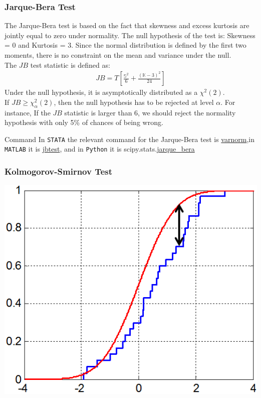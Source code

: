 \documentclass[xcolor=dvipsnames, english, 8pt]{beamer}
\begin{document}
\begin{frame}
    \frametitle{Jarque-Bera Test}
    The Jarque-Bera test is based on the fact that skewness and excess kurtosis are jointly equal to zero under normality. The null hypothesis of the test is: Skewness = 0 and Kurtosis = 3. Since the normal distribution is defined by the first two moments, there is no constraint on the mean and variance under the null.\vspace{0.25cm}\\
    The $JB$ test statistic is defined as:
    \begin{align}
        JB = T \left[\frac{\mathbb{S}^2}{6} + \frac{(\mathbb{K}-3)^2}{24}\right]
    \end{align}
Under the null hypothesis, it is asymptotically distributed as a $\chi^2 (2)$.\\
If $JB \geq \chi_{\alpha}^2 (2)$, then the null hypothesis has to be rejected at level $\alpha$. For instance, If the $JB$ statistic is larger than 6, we should reject the normality hypothesis
with only 5\% of chances of being wrong.
\vfill
\begin{exampleblock}{{\small{Command}}}
In  \texttt{STATA} the relevant command for the Jarque-Bera test is \href{https://www.stata.com/manuals13/tsvarnorm.pdf}{\color{Purple}varnorm},in \texttt{MATLAB} it is \href{https://ch.mathworks.com/help/stats/jbtest.html}{\color{Purple}jbtest}, and in \texttt{Python} it is scipy.stats.\href{https://docs.scipy.org/doc/scipy/reference/generated/scipy.stats.jarque\_bera.html}{\color{Purple}jarque\_bera}
\end{exampleblock}
\end{frame}

\begin{frame}
    \frametitle{Kolmogorov-Smirnov Test}
\begin{center}
    \includegraphics[scale=0.5]{KS}
\end{center}
\end{frame}
\end{document}
